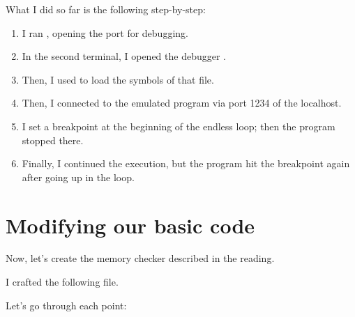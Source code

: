 What I did so far is the following step-by-step:

\begin{enumerate}
    \item I ran , opening the port  for debugging.
    \item In the second terminal, I opened the debugger .
    \item Then, I used  to load the symbols of that file.
    \item Then, I connected to the emulated program via port 1234 of the localhost.
    \item I set a breakpoint at the beginning of the endless loop; then the program stopped there.
    \item Finally, I continued the execution, but the program hit the breakpoint again after going up in the loop.
\end{enumerate}

\section{Modifying our basic code}

Now, let's create the memory checker described in the reading.

I crafted the following file.


Let's go through each point:

